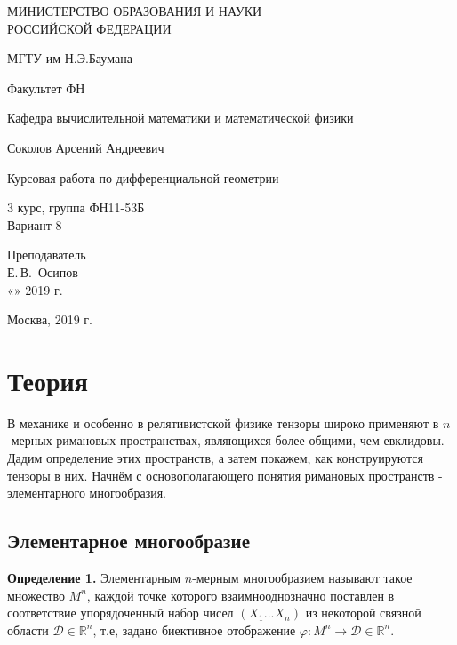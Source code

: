 \documentclass[14pt,a4paper]{scrartcl}
\begin{document}
	\begin{titlepage}
	\begin{center}
		\large
		МИНИСТЕРСТВО ОБРАЗОВАНИЯ И НАУКИ\\ РОССИЙСКОЙ ФЕДЕРАЦИИ
		
		\vspace{0.5cm}
		
		МГТУ им Н.Э.Баумана
		\vspace{0.25cm}
		
		Факультет ФН
		
		Кафедра вычислительной математики и математической физики
		\vfill
		
		
		Соколов Арсений Андреевич\\
		\vfill
		
		
		{\LARGE Курсовая работа по дифференциальной геометрии\\[2mm]
		}
		\bigskip
		
		3 курс, группа ФН11-53Б\\
		Вариант 8
	\end{center}
	\vfill
	
	\newlength{\ML}
	\hfill\begin{minipage}{0.4\textwidth}
		Преподаватель\\
		\underline{\hspace{3cm}} Е.\,В.~Осипов\\
		«\underline{\hspace{0.7cm}}» \underline{\hspace{1.71cm}} 2019 г.
	\end{minipage}%
	\bigskip
	
	
	\vfill
	
	\begin{center}
		Москва, 2019 г.
	\end{center}
\end{titlepage}
\section{Теория}
В механике и особенно в релятивистской физике тензоры широко применяют в $n$-мерных римановых пространствах, являющихся более общими, чем евклидовы. Дадим определение этих пространств, а затем покажем, как конструируются тензоры в них. Начнём с основополагающего понятия римановых пространств - элементарного многообразия.

\subsection{Элементарное многообразие}
\textbf{Определение 1.} Элементарным $n$-мерным многообразием называют такое множество $M^n$, каждой точке которого
взаимнооднозначно поставлен в соответствие упорядоченный набор чисел $(X_1...X_n)$ из некоторой связной области $\mathcal{D} \in \mathbb{R}^n$, т.е, задано биективное отображение $\varphi: M^n \longrightarrow \mathcal{D} \in \mathbb{R}^n$.
\end{document}
